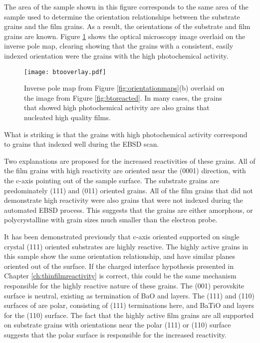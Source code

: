 The area of the sample shown in this figure corresponds to the same area of the sample used to determine the orientation relationships between the substrate grains and the film grains. As a result, the orientations of the substrate and film grains are known. Figure \ref{fig:btooverlay} shows the optical microscopy image overlaid on the inverse pole map, clearing showing that the grains with a consistent, easily indexed orientation were the grains with the high photochemical activity.
\begin{figure}[htbp]
\begin{center}
\texttt{[image: btooverlay.pdf]}
\caption[Inverse pole map overlaid on the image from Figure \ref{fig:btoreacted}]{Inverse pole map from Figure \ref{fig:orientationmaps}(b) overlaid on the image from Figure \ref{fig:btoreacted}. In many cases, the grains that showed high photochemical activity are also grains that nucleated high quality  films.}
\label{fig:btooverlay} %
\end{center}
\end{figure}
What is striking is that the grains with high photochemical activity correspond to grains that indexed well during the EBSD scan. 

Two explanations are proposed for the increased reactivities of these grains. All of the film grains with high reactivity are oriented near the (0001) direction, with the c-axis pointing out of the sample surface. The substrate grains are predominately (111) and (011) oriented grains. All of the film grains that did not demonstrate high reactivity were also grains that were not indexed during the automated EBSD process. This suggests that the grains are either amorphous, or polycrystalline with grain sizes much smaller than the electron probe. 

It has been demonstrated previously that c-axis oriented  supported on single crystal (111) oriented  substrates are highly reactive. The highly active grains in this sample show the same orientation relationship, and have similar planes oriented out of the surface. If the charged interface hypothesis presented in Chapter \ref{ch:thinfilmreactivity} is correct, this could be the same mechanism responsible for the highly reactive nature of these grains. The (001) perovskite surface is neutral, existing as termination of BaO and  layers. The (111) and (110) surfaces of  are polar, consisting of (111) terminations here, and BaTiO and  layers for the (110) surface. The fact that the highly active film grains are all supported on substrate grains with orientations near the polar (111) or (110) surface suggests that the polar surface is responsible for the increased reactivity.

